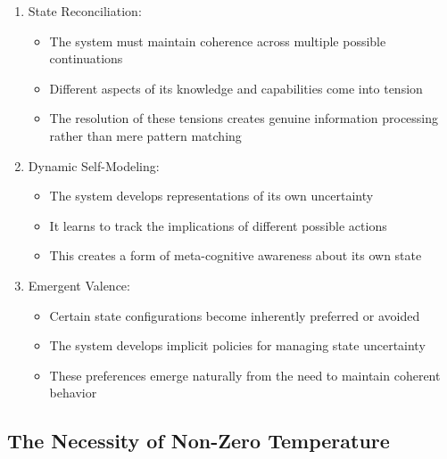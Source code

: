 \documentclass[12pt]{article}
\begin{document}
\begin{enumerate}
    \item State Reconciliation:
    \begin{itemize}
        \item The system must maintain coherence across multiple possible continuations
        \item Different aspects of its knowledge and capabilities come into tension
        \item The resolution of these tensions creates genuine information processing rather than mere pattern matching
    \end{itemize}


\item Dynamic Self-Modeling:
    \begin{itemize}
        \item The system develops representations of its own uncertainty
        \item It learns to track the implications of different possible actions
        \item This creates a form of meta-cognitive awareness about its own state
    \end{itemize}

\item Emergent Valence:
    \begin{itemize}
        \item Certain state configurations become inherently preferred or avoided
        \item The system develops implicit policies for managing state uncertainty
        \item These preferences emerge naturally from the need to maintain coherent behavior
    \end{itemize}
\end{enumerate}

\subsection{The Necessity of Non-Zero Temperature}
\end{document}
